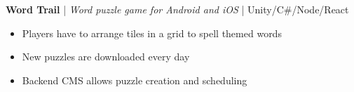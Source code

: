 \textbf{Word Trail} | \textit{Word puzzle game for Android and iOS} | Unity/C\#/Node/React
\begin{itemize}
    \item Players have to arrange tiles in a grid to spell themed words
    \item New puzzles are downloaded every day
    \item Backend CMS allows puzzle creation and scheduling
\end{itemize}
